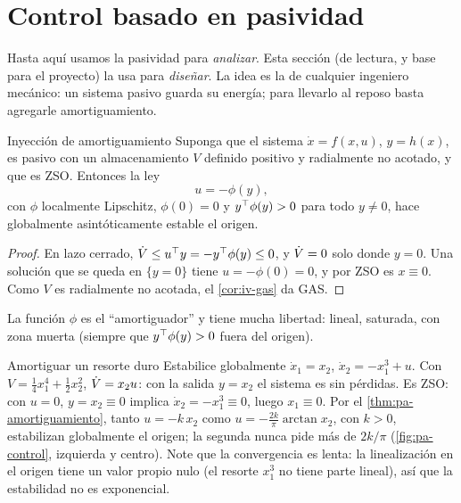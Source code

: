 \section{Control basado en pasividad}
\label{sec:pa-control}

Hasta aquí usamos la pasividad para \emph{analizar}. Esta sección (de lectura, y base para el proyecto) la usa para \emph{diseñar}. La idea es la de cualquier ingeniero mecánico: un sistema pasivo guarda su energía; para llevarlo al reposo basta agregarle amortiguamiento.

\begin{teorema}[label=thm:pa-amortiguamiento]{Inyección de amortiguamiento \citep[\S14.4]{Kha02}}
Suponga que el sistema $\dot x=f(x,u)$, $y=h(x)$, es pasivo con un almacenamiento $V$ definido positivo y radialmente no acotado, y que es ZSO. Entonces la ley
\begin{equation}
  u=-\phi(y),
  \label{eq:pa-amortiguamiento}
\end{equation}
con $\phi$ localmente Lipschitz, $\phi(0)=0$ y $y^{\top}\phi(y)>0$ para todo $y\neq0$, hace globalmente asintóticamente estable el origen.
\end{teorema}

\begin{proof}
En lazo cerrado, $\dot V\le u^{\top} y=-y^{\top}\phi(y)\le0$, y $\dot V=0$ solo donde $y=0$. Una solución que se queda en $\{y=0\}$ tiene $u=-\phi(0)=0$, y por ZSO es $x\equiv0$. Como $V$ es radialmente no acotada, el \cref{cor:iv-gas} da GAS.
\end{proof}

La función $\phi$ es el ``amortiguador'' y tiene mucha libertad: lineal, saturada, con zona muerta (siempre que $y^{\top}\phi(y)>0$ fuera del origen).

\begin{ejemplo}[label=ej:pa-amortiguar]{Amortiguar un resorte duro}
Estabilice globalmente $\dot x_1=x_2$, $\dot x_2=-x_1^3+u$.
\solucion Con $V=\tfrac14x_1^4+\tfrac12x_2^2$, $\dot V=x_2u$: con la salida $y=x_2$ el sistema es sin pérdidas. Es ZSO: con $u=0$, $y=x_2\equiv0$ implica $\dot x_2=-x_1^3\equiv0$, luego $x_1\equiv0$. Por el \cref{thm:pa-amortiguamiento}, tanto $u=-k\,x_2$ como $u=-\tfrac{2k}\pi\arctan x_2$, con $k>0$, estabilizan globalmente el origen; la segunda nunca pide más de $2k/\pi$ (\cref{fig:pa-control}, izquierda y centro). Note que la convergencia es lenta: la linealización en el origen tiene un valor propio nulo (el resorte $x_1^3$ no tiene parte lineal), así que la estabilidad no es exponencial.
\end{ejemplo}

